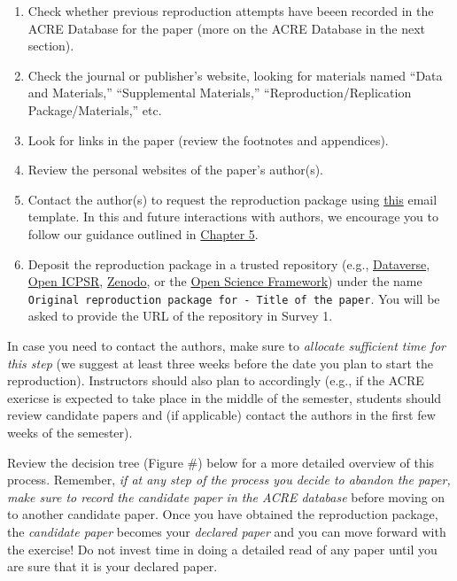 \documentclass[]{book}
\providecommand{\tightlist}{%
  \setlength{\itemsep}{0pt}\setlength{\parskip}{0pt}}
\begin{document}
\begin{enumerate}
\def\labelenumi{\arabic{enumi}.}
\tightlist
\item
  Check whether previous reproduction attempts have beeen recorded in the ACRE Database for the paper (more on the ACRE Database in the next section).
\item
  Check the journal or publisher's website, looking for materials named ``Data and Materials,'' ``Supplemental Materials,'' ``Reproduction/Replication Package/Materials,'' etc.\\
\item
  Look for links in the paper (review the footnotes and appendices).\\
\item
  Review the personal websites of the paper's author(s).
\item
  Contact the author(s) to request the reproduction package using \href{https://bitss.github.io/ACRE/guidance-for-a-constructive-exchange-between-reproducers-and-original-authors.html\#contacting-the-original-authors-when-there-is-no-reproduction-package}{this} email template. In this and future interactions with authors, we encourage you to follow our guidance outlined in \href{https://bitss.github.io/ACRE/guidance-for-a-constructive-exchange-between-reproducers-and-original-authors.html\#contacting-the-original-authors-when-there-is-no-reproduction-package}{Chapter 5}.
\item
  Deposit the reproduction package in a trusted repository (e.g., \href{https://dataverse.org/}{Dataverse}, \href{https://www.openicpsr.org/openicpsr/}{Open ICPSR}, \href{https://zenodo.org/}{Zenodo}, or the \href{https://osf.io/}{Open Science Framework}) under the name \texttt{Original\ reproduction\ package\ for\ -\ Title\ of\ the\ paper}. You will be asked to provide the URL of the repository in Survey 1.
\end{enumerate}

In case you need to contact the authors, make sure to \emph{allocate sufficient time for this step} (we suggest at least three weeks before the date you plan to start the reproduction). Instructors should also plan to accordingly (e.g., if the ACRE exericse is expected to take place in the middle of the semester, students should review candidate papers and (if applicable) contact the authors in the first few weeks of the semester).

Review the decision tree (Figure \#) below for a more detailed overview of this process. Remember, \emph{if at any step of the process you decide to abandon the paper, make sure to record the candidate paper in the ACRE database} before moving on to another candidate paper. Once you have obtained the reproduction package, the \emph{candidate paper} becomes your \emph{declared paper} and you can move forward with the exercise! Do not invest time in doing a detailed read of any paper until you are sure that it is your declared paper.
\end{document}
